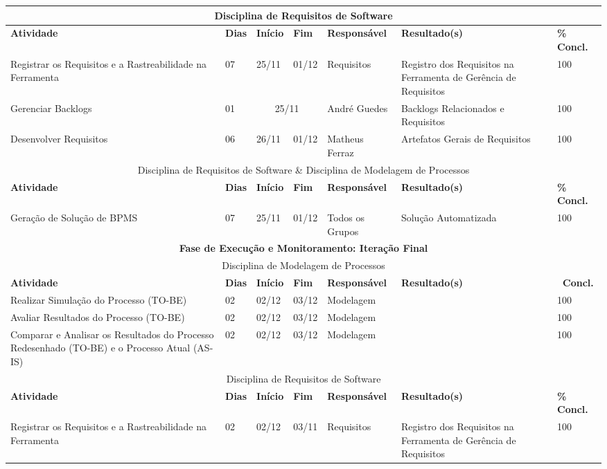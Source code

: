 \begin{center}
	\begin{tabular}{|m{6cm}|m{1cm}|m{1cm}|m{1cm}|m{4cm}|m{6cm}|m{2cm}|}
	\hline
	\multicolumn{7}{|c|}{Disciplina de Requisitos de Software} \\
	\hline
	\textbf{Atividade} & \textbf{Dias} & \textbf{Início} & \textbf{Fim} & \textbf{Responsável} & \textbf{Resultado(s)} & \textbf{\% Concl.} \\ \hline
	Registrar os Requisitos e a Rastreabilidade na Ferramenta & 07 & 25/11 & 01/12 & Requisitos & Registro dos Requisitos na Ferramenta de Gerência de Requisitos & 100 \\ \hline
	Gerenciar Backlogs & 01 & \multicolumn{2}{c|}{25/11} & André Guedes & Backlogs Relacionados e Requisitos & 100 \\ \hline
	Desenvolver Requisitos & 06 & 26/11 & 01/12 & Matheus Ferraz & Artefatos Gerais de Requisitos & 100 \\ \hline
	\multicolumn{7}{|c|}{Disciplina de Requisitos de Software \& Disciplina de Modelagem de Processos} \\ \hline
	\textbf{Atividade} & \textbf{Dias} & \textbf{Início} & \textbf{Fim} & \textbf{Responsável} & \textbf{Resultado(s)} & \textbf{\% Concl.} \\ \hline
	Geração de Solução de BPMS & 07 & 25/11 & 01/12 & Todos os Grupos & Solução Automatizada & 100 \\ \hline
	\multicolumn{7}{|c|}{\textbf{Fase de Execução e Monitoramento: Iteração Final}} \\
	\hline
	\multicolumn{7}{|c|}{Disciplina de Modelagem de Processos} \\
	\hline
	\textbf{Atividade} & \textbf{Dias} & \textbf{Início} & \textbf{Fim} & \textbf{Responsável} & \textbf{Resultado(s)} & \textbf{\ Concl.} \\ \hline
	Realizar Simulação do Processo (TO-BE) & 02 & 02/12 & 03/12 & Modelagem & & 100 \\ \hline
	Avaliar Resultados do Processo (TO-BE) & 02 & 02/12 & 03/12 & Modelagem & & 100 \\ \hline
	Comparar e Analisar os Resultados do Processo Redesenhado (TO-BE) e o Processo Atual (AS-IS) & 02 & 02/12 & 03/12 & Modelagem & & 100 \\ \hline
	\multicolumn{7}{|c|}{Disciplina de Requisitos de Software} \\
	\hline
	\textbf{Atividade} & \textbf{Dias} & \textbf{Início} & \textbf{Fim} & \textbf{Responsável} & \textbf{Resultado(s)} & \textbf{\% Concl.} \\ \hline
	Registrar os Requisitos e a Rastreabilidade na Ferramenta & 02 & 02/12 & 03/11 & Requisitos & Registro dos Requisitos na Ferramenta de Gerência de Requisitos & 100 \\ \hline
	\end{tabular}
\end{center}
